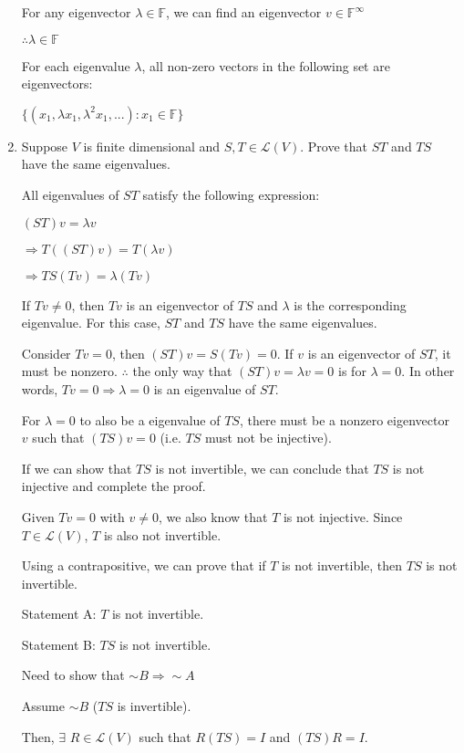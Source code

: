 \documentclass[fleqn]{article}
\begin{document}
\begin{enumerate}[nolistsep]
				For any eigenvector $\lambda \in \mathbb{F}$, we can find an eigenvector $v \in \mathbb{F}^\infty$
				 
				 $\therefore \lambda \in \mathbb{F}$
				 
				 For each eigenvalue $\lambda$, all non-zero vectors in the following set are eigenvectors:
				 
				 $\{(x_1,{\lambda}x_1,{\lambda}^2x_1, ...) : x_1 \in \mathbb{F}\}$
				 
			\item Suppose $V$ is finite dimensional and $S,T \in \mathcal{L}(V)$. Prove that $ST$ and $TS$ have the same eigenvalues.
			
			\pagebreak
			All eigenvalues of $ST$ satisfy the following expression:
			
			$(ST)v = {\lambda}v$
			
			$\Rightarrow T((ST)v) = T({\lambda}v)$
			
			$\Rightarrow TS(Tv) = \lambda(Tv)$
			
			If $Tv \neq 0$, then $Tv$ is an eigenvector of $TS$ and $\lambda$ is the corresponding eigenvalue. For this case, $ST$ and $TS$ have the same eigenvalues.
			
			Consider $Tv = 0$, then $(ST)v = S(Tv) = 0$. If $v$ is an eigenvector of $ST$, it must be nonzero. $\therefore$ the only way that $(ST)v = {\lambda}v = 0$ is for $\lambda = 0$. In other words, $Tv = 0 \Rightarrow \lambda = 0$ is an eigenvalue of $ST$.
			
			For $\lambda = 0$ to also be a eigenvalue of $TS$, there must be a nonzero eigenvector $v$ such that $(TS)v = 0$ (i.e. $TS$ must not be injective).
			
			If we can show that $TS$ is not invertible, we can conclude that $TS$ is not injective and complete the proof.
			
			Given $Tv = 0$ with $v \neq 0$, we also know that $T$ is not injective. Since $T \in \mathcal{L}(V)$, $T$ is also not invertible. 
			
			Using a contrapositive, we can prove that if $T$ is not invertible, then $TS$ is not invertible.
			
			Statement A: $T$ is not invertible.
			
			Statement B: $TS$ is not invertible.
			
			Need to show that ${\sim}B \Rightarrow {\sim}A$
			
			Assume ${\sim}B$ ($TS$ is invertible).
			
			Then, $\exists$ $R \in \mathcal{L}(V)$ such that $R(TS) = I$ and $(TS)R = I$.
			

\end{enumerate}
\end{document}
